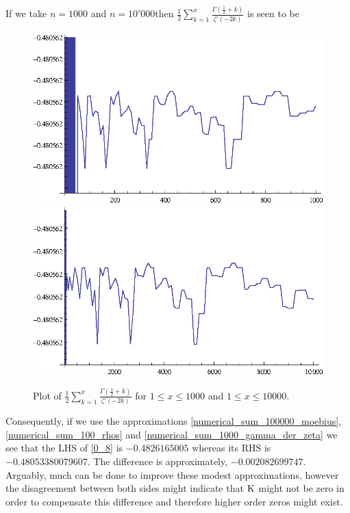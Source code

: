 \documentclass[11pt]{article}
\numberwithin{equation}{section}		 			%
\numberwithin{figure}{section}			 			%
\begin{document}
If we take $n=1000$ and $n=10'000 $then $\tfrac{1}{2}\sum\nolimits_{k = 1}^x {\tfrac{{\Gamma (\tfrac{1}{2} + k)}}{{\zeta '( - 2k)}}}$ is seen to be
\begin{figure}[H]
		\includegraphics[scale=0.96]{GammZetaDerivative10100100010000_gr3.eps}
		\includegraphics[scale=0.96]{GammZetaDerivative10100100010000_gr4.eps}
	\caption{Plot of $\tfrac{1}{2}\sum\nolimits_{k = 1}^x {\tfrac{{\Gamma (\tfrac{1}{2} + k)}}{{\zeta '( - 2k)}}}$ for $1 \le x \le 1000$ and $1 \le x \le 10000$.}
\end{figure}
\noindent Consequently, if we use the approximations \eqref{numerical_sum_100000_moebius}, \eqref{numerical_sum_100_rhos} and \eqref{numerical_sum_1000_gamma_der_zeta} we see that the LHS of \eqref{0_8} is $-0.4826165005$ whereas its RHS is $-0.48053380079607$. The difference is approximately, $-0.002082699747$.\\ 
Arguably, much can be done to improve these modest approximations, however the disagreement between both sides might indicate that $\rm{K}$ might not be zero in order to compensate this difference and therefore higher order zeros might exist.
\end{document}
